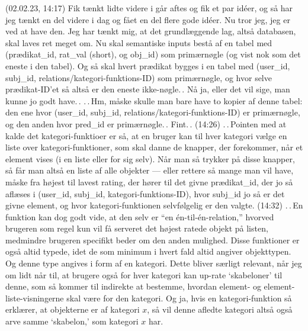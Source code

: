 \documentclass{report}
\begin{document}
(02.02.23, 14:17) Fik tænkt lidte videre i går aftes og fik et par idéer, og så har jeg tænkt en del videre i dag og fået en del flere gode idéer. Nu tror jeg, jeg er ved at have den. Jeg har tænkt mig, at det grundlæggende lag, altså databasen, skal laves ret meget om. Nu skal semantiske inputs bestå af en tabel med (prædikat\_id, rat\_val (short), og obj\_id) som primærnøgle (og vist nok som det eneste i den tabel). Og så skal hvert prædikat bygges i en tabel med (user\_id, subj\_id, relations/kategori-funktions-ID) som primærnøgle, og hvor selve prædikat-ID'et så altså er den eneste ikke-nøgle.\,. Nå ja, eller det vil sige, man kunne jo godt have.\,. .\,.\,Hm, måske skulle man bare have to kopier af denne tabel: den ene hvor (user\_id, subj\_id, relations/kategori-funktions-ID) er primærnøgle, og den anden hvor pred\_id er primærnøgle.\,. Fint.\,. (14:26) .\,.\,Pointen med at kalde det kategori-funktioer er så, at en bruger kan til hver kategori vælge en liste over kategori-funktioner, som skal danne de knapper, der forekommer, når et element vises (i en liste eller for sig selv). Når man så trykker på disse knapper, så får man altså en liste af alle objekter --- eller rettere så mange man vil have, måske fra højest til lavest rating, der hører til det givne prædikat\_id, der jo så aflæses i (user\_id, subj\_id, kategori-funktions-ID), hvor subj\_id jo så er det givne element, og hvor kategori-funktionen selvfølgelig er den valgte. (14:32) .\,.\,En funktion kan dog godt vide, at den selv er ``en én-til-én-relation,'' hvorved brugeren som regel kun vil få serveret det højest ratede objekt på listen, medmindre brugeren specifikt beder om den anden mulighed. Disse funktioner er også altid typede, idet de som minimum i hvert fald altid angiver objekttypen. Og denne type angives i form af en kategori. Dette bliver særligt relevant, når jeg om lidt når til, at brugere også for hver kategori kan up-rate `skabeloner' til denne, som så kommer til indirekte at bestemme, hvordan element- og element-liste-visningerne skal være for den kategori. Og ja, hvis en kategori-funktion så erklærer, at objekterne er af kategori $x$, så vil denne afledte kategori altså også arve samme `skabelon,' som kategori $x$ har. 
\end{document}
